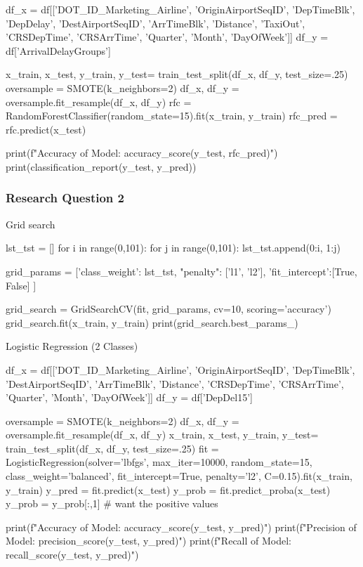 \documentclass[a4paper,12pt]{article}
\begin{document}
\begin{python}
df_x = df[['DOT_ID_Marketing_Airline', 'OriginAirportSeqID', 'DepTimeBlk', 'DepDelay', 'DestAirportSeqID', 'ArrTimeBlk', 'Distance', 'TaxiOut', 'CRSDepTime', 'CRSArrTime',
 'Quarter', 'Month', 'DayOfWeek']]
df_y = df['ArrivalDelayGroups']

x_train, x_test, y_train, y_test= train_test_split(df_x, df_y, test_size=.25)
oversample = SMOTE(k_neighbors=2)
df_x, df_y = oversample.fit_resample(df_x, df_y)
rfc = RandomForestClassifier(random_state=15).fit(x_train, y_train)
rfc_pred = rfc.predict(x_test)

print(f"Accuracy of Model: {accuracy_score(y_test, rfc_pred)}")
print(classification_report(y_test, y_pred))
\end{python}

\subsubsection{Research Question 2}

Grid search \label{gridsearch}
\begin{python}

lst_tst = []
for i in range(0,101):
    for j in range(0,101):
        lst_tst.append({0:i, 1:j})

grid_params = [{'class_weight': lst_tst,
"penalty": ['l1', 'l2'],
'fit_intercept':[True, False]
}]

grid_search = GridSearchCV(fit, grid_params, cv=10, scoring='accuracy')
grid_search.fit(x_train, y_train)
print(grid_search.best_params_)

\end{python}

Logistic Regression (2 Classes)

\begin{python}
df_x = df[['DOT_ID_Marketing_Airline', 'OriginAirportSeqID', 'DepTimeBlk', 'DestAirportSeqID', 'ArrTimeBlk', 'Distance', 'CRSDepTime',
 'CRSArrTime', 'Quarter', 'Month', 'DayOfWeek']]
df_y = df['DepDel15']

oversample = SMOTE(k_neighbors=2)
df_x, df_y = oversample.fit_resample(df_x, df_y)
x_train, x_test, y_train, y_test= train_test_split(df_x, df_y, test_size=.25)
fit = LogisticRegression(solver='lbfgs', max_iter=10000, random_state=15, class_weight='balanced', fit_intercept=True, penalty='l2', C=0.15).fit(x_train, y_train)
y_pred = fit.predict(x_test)
y_prob = fit.predict_proba(x_test)
y_prob = y_prob[:,1] # want the positive values

print(f"Accuracy of Model: {accuracy_score(y_test, y_pred)}")
print(f"Precision of Model: {precision_score(y_test, y_pred)}")
print(f"Recall of Model: {recall_score(y_test, y_pred)}")
\end{python}
\end{document}
